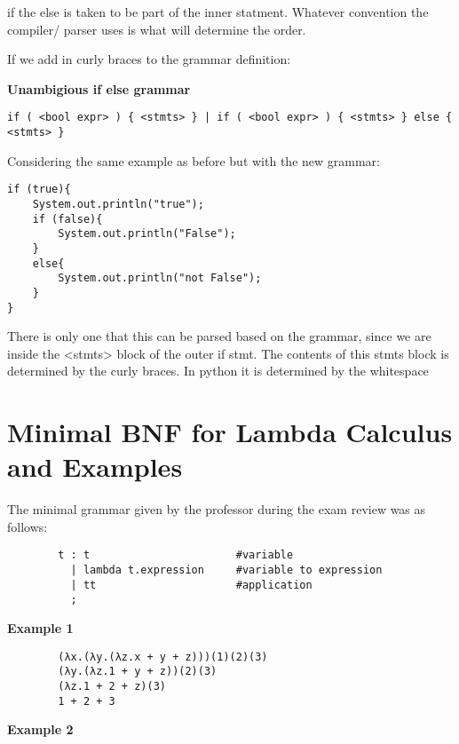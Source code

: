 \documentclass[11pt]{article}
\begin{document}
if the else is taken to be part of the inner statment.  Whatever convention the
compiler/ parser uses is what will determine the order.

If we add in curly braces to the grammar definition:

\textbf{Unambigious if else grammar}
\begin{lstlisting}[style=MyC++]
if ( <bool expr> ) { <stmts> } | if ( <bool expr> ) { <stmts> } else { <stmts> }
\end{lstlisting}


Considering the same example as before but with the new grammar:



\begin{lstlisting}[style=MyC++]
if (true){
    System.out.println("true");
    if (false){
        System.out.println("False");
    }
    else{
        System.out.println("not False");
    }
}
\end{lstlisting}



There is only one that this can be parsed based on the grammar, since we are
inside the <stmts> block of the outer if stmt.  The contents of this stmts
block is determined by the curly braces.  In python it is determined by the
whitespace



\newpage
\section{Minimal BNF for Lambda Calculus and Examples}

The minimal grammar given by the professor during the exam review was as
follows:\\
\begin{lstlisting}
        t : t                       #variable
          | lambda t.expression     #variable to expression
          | tt                      #application
          ;
\end{lstlisting}


\textbf{Example 1}
\begin{lstlisting}
        (λx.(λy.(λz.x + y + z)))(1)(2)(3)
        (λy.(λz.1 + y + z))(2)(3)
        (λz.1 + 2 + z)(3)
        1 + 2 + 3
\end{lstlisting}


\textbf{Example 2}
\begin{lstlisting}
\end{lstlisting}
\end{document}
